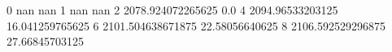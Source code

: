 0 nan nan
1 nan nan
2 2078.924072265625 0.0
4 2094.96533203125 16.041259765625
6 2101.504638671875 22.58056640625
8 2106.592529296875 27.66845703125
